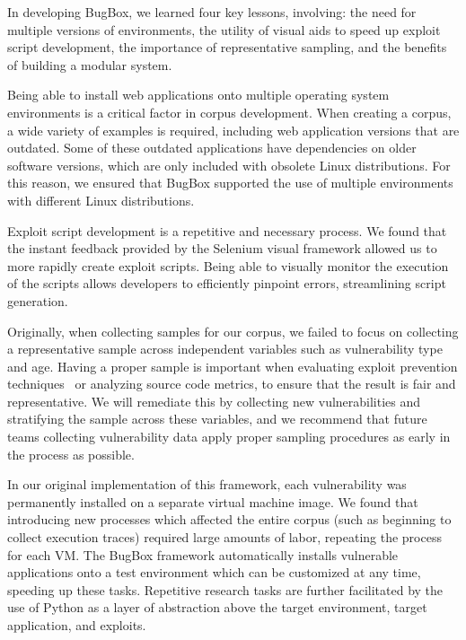\documentclass[letterpaper,twocolumn,10pt]{article}
\begin{document}
In developing BugBox, we learned four key lessons, involving: the need for multiple versions of environments, the utility of visual aids to speed up exploit script development, the importance of representative sampling, and the benefits of building a modular system.\par

Being able to install web applications onto multiple operating system environments is a critical factor in corpus development. When creating a corpus, a wide variety of examples is required, including web application versions that are outdated.  Some of these outdated applications have dependencies on older software versions, which are only included with obsolete Linux distributions. For this reason, we ensured that BugBox supported the use of multiple environments with different Linux distributions.\par

Exploit script development is a repetitive and necessary process. We found that the instant feedback provided by the Selenium visual framework allowed us to more rapidly create exploit scripts.  Being able to visually monitor the execution of the scripts allows developers to efficiently pinpoint errors, streamlining script generation.  \par

Originally, when collecting samples for our corpus, we failed to focus on collecting a representative sample across independent variables such as vulnerability type and age. Having a proper sample is important when evaluating exploit prevention techniques~\cite{testbedpaper} or analyzing source code metrics, to ensure that the result is fair and representative. We will remediate this by collecting new vulnerabilities and stratifying the sample across these variables, and we recommend that future teams collecting vulnerability data apply proper sampling procedures as early in the process as possible.\par

In our original implementation of this framework, each vulnerability was permanently installed on a separate virtual machine image. We found that introducing new processes which affected the entire corpus (such as beginning to collect execution traces) required large amounts of labor, repeating the process for each VM. The BugBox framework automatically installs vulnerable applications onto a test environment which can be customized at any time, speeding up these tasks. Repetitive research tasks are further facilitated by the use of Python as a layer of abstraction above the target environment, target application, and exploits.
\end{document}
